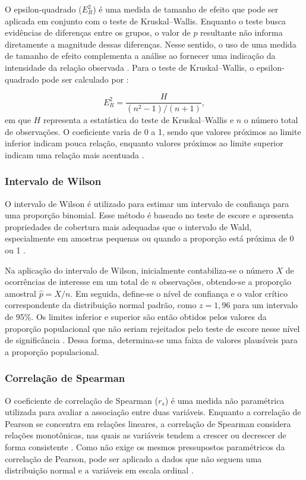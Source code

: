 \documentclass[12pt]{article}
\begin{document}
O epsilon-quadrado ($E_R^2$) é uma medida de tamanho de efeito que pode ser aplicada em conjunto com o teste de Kruskal--Wallis. Enquanto o teste busca evidências de diferenças entre os grupos, o valor de $p$ resultante não informa diretamente a magnitude dessas diferenças. Nesse sentido, o uso de uma medida de tamanho de efeito complementa a análise ao fornecer uma indicação da intensidade da relação observada \cite{tomczak2014need}. Para o teste de Kruskal--Wallis, o epsilon-quadrado pode ser calculado por \cite{tomczak2014need}:

\begin{equation}
E_R^2 = \frac{H}{(n^2-1)/(n+1)},
\end{equation}
em que $H$ representa a estatística do teste de Kruskal--Wallis e $n$ o número total de observações. O coeficiente varia de 0 a 1, sendo que valores próximos ao limite inferior indicam pouca relação, enquanto valores próximos ao limite superior indicam uma relação mais acentuada \cite{tomczak2014need}.

\subsubsection{Intervalo de Wilson}

O intervalo de Wilson é utilizado para estimar um intervalo de confiança para uma proporção binomial. Esse método é baseado no teste de escore e apresenta propriedades de cobertura mais adequadas que o intervalo de Wald, especialmente em amostras pequenas ou quando a proporção está próxima de 0 ou 1 \cite{brown2001interval}.

Na aplicação do intervalo de Wilson, inicialmente contabiliza-se o número $X$ de ocorrências de interesse em um total de $n$ observações, obtendo-se a proporção amostral $\hat{p}=X/n$. Em seguida, define-se o nível de confiança e o valor crítico correspondente da distribuição normal padrão, como $z=1{,}96$ para um intervalo de 95\%. Os limites inferior e superior são então obtidos pelos valores da proporção populacional que não seriam rejeitados pelo teste de escore nesse nível de significância \cite{agresti2007}. Dessa forma, determina-se uma faixa de valores plausíveis para a proporção populacional.

\subsubsection{Correlação de Spearman}

O coeficiente de correlação de Spearman ($r_s$) é uma medida não paramétrica utilizada para avaliar a associação entre duas variáveis. Enquanto a correlação de Pearson se concentra em relações lineares, a correlação de Spearman considera relações monotônicas, nas quais as variáveis tendem a crescer ou decrescer de forma consistente \cite{navarro2015learning}. Como não exige os mesmos pressupostos paramétricos da correlação de Pearson, pode ser aplicado a dados que não seguem uma distribuição normal e a variáveis em escala ordinal \cite{field2009discovering}.
\end{document}

